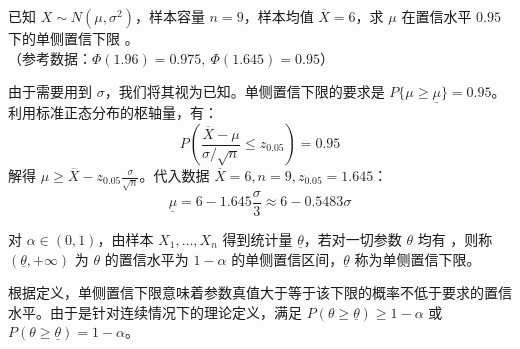 \documentclass[lang=cn,11pt]{elegantbook}
\begin{document}
\begin{exercise} \label{prob:ci_4}
已知 $X\sim N(\mu,\sigma^2)$，样本容量 $n=9$，样本均值 $\overline{X}=6$，求 $\mu$ 在置信水平 $0.95$ 下的单侧置信下限 \underline{\qquad\qquad}。\\
（参考数据：$\Phi(1.96)=0.975,\ \Phi(1.645)=0.95$）
\end{exercise}
\begin{solution}
由于需要用到 $\sigma$，我们将其视为已知。单侧置信下限的要求是 $P\{\mu \ge \underline{\mu}\} = 0.95$。
利用标准正态分布的枢轴量，有：
\begin{equation*}
P\left( \frac{\overline{X}-\mu}{\sigma/\sqrt{n}} \le z_{0.05} \right) = 0.95
\end{equation*}
解得 $\mu \ge \overline{X} - z_{0.05}\frac{\sigma}{\sqrt{n}}$。代入数据 $\overline{X}=6, n=9, z_{0.05}=1.645$：
\begin{equation*}
\underline{\mu} = 6 - 1.645 \frac{\sigma}{3} \approx 6 - 0.5483\sigma
\end{equation*}
\end{solution}

\begin{exercise} \label{prob:ci_5}
对 $\alpha\in(0,1)$，由样本 $X_1,\dots,X_n$ 得到统计量 $\underline{\theta}$，若对一切参数 $\theta$ 均有 \underline{\qquad\qquad}，则称 $(\underline{\theta},+\infty)$ 为 $\theta$ 的置信水平为 $1-\alpha$ 的单侧置信区间，$\underline{\theta}$ 称为单侧置信下限。
\end{exercise}
\begin{solution}
根据定义，单侧置信下限意味着参数真值大于等于该下限的概率不低于要求的置信水平。由于是针对连续情况下的理论定义，满足 $P(\theta \ge \underline{\theta}) \ge 1-\alpha$ 或 $P(\theta \ge \underline{\theta}) = 1-\alpha$。
\end{solution}
\end{document}
